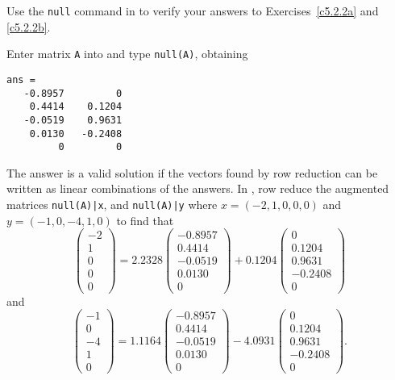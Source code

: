 \documentclass{ximera}
\begin{document}
\begin{computerExercise} \label{c5.3.2}
Use the {\tt null} command in \Matlab to verify your answers to
Exercises~\ref{c5.2.2a} and \ref{c5.2.2b}.

\begin{solution}

Enter matrix {\tt A} into \Matlab and type {\tt null(A)}, obtaining
\begin{verbatim}
ans =
   -0.8957         0
    0.4414    0.1204
   -0.0519    0.9631
    0.0130   -0.2408
         0         0
\end{verbatim}
The \Matlab answer is a valid solution if the vectors found
by row reduction can be written as linear combinations of the \Matlab
answers.  In \Matlab, row reduce the augmented matrices {\tt null(A)|x},
and {\tt null(A)|y} where $x = (-2,1,0,0,0)$ and $y = (-1,0,-4,1,0)$ 
to find that
\[
\left(\begin{array}{r} -2 \\ 1 \\ 0 \\ 0 \\ 0 \end{array}\right) =
2.2328\left(\begin{array}{r} -0.8957 \\ 0.4414 \\ -0.0519 \\ 0.0130 \\ 0
\end{array}\right) + 0.1204\left(\begin{array}{r} 0 \\ 0.1204 \\ 0.9631 \\
-0.2408 \\ 0 \end{array}\right)
\]
and
\[
\left(\begin{array}{r} -1 \\ 0 \\ -4 \\ 1 \\ 0 \end{array}\right) =
1.1164\left(\begin{array}{r} -0.8957 \\ 0.4414 \\ -0.0519 \\ 0.0130 \\ 0
\end{array}\right) - 4.0931\left(\begin{array}{r} 0 \\ 0.1204 \\ 0.9631 \\
-0.2408 \\ 0 \end{array}\right).
\]


\end{solution}
\end{computerExercise}
\end{document}
